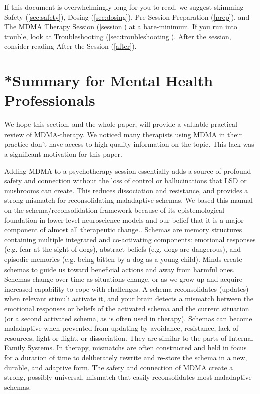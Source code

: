 \documentclass[12pt,letterpaper]{article}
\begin{document}
If this document is overwhelmingly long for you to read, we suggest skimming Safety (\ref{sec:safety}), Dosing (\ref{sec:dosing}), Pre-Session Preparation (\ref{prep}), and The MDMA Therapy Session (\ref{session}) at a bare-minimum. If you run into trouble, look at Troubleshooting (\ref{sec:troubleshooting}). After the session, consider reading After the Session (\ref{after}).
\section{*Summary for Mental Health Professionals}
We hope this section, and the whole paper, will provide a valuable practical review of MDMA-therapy. We noticed many therapists using MDMA in their practice don't have access to high-quality information on the topic. This lack was a significant motivation for this paper.

Adding MDMA to a psychotherapy session essentially adds a source of profound safety and connection without the loss of control or hallucinations that LSD or mushrooms can create. This reduces dissociation and resistance, and provides a strong mismatch for reconsolidating maladaptive schemas. We based this manual on the schema/reconsolidation framework because of its epistemological foundation in lower-level neuroscience models and our belief that it is a major component of almost all therapeutic change.. Schemas are memory structures containing multiple integrated and co-activating components: emotional responses (e.g. fear at the sight of dogs), abstract beliefs (e.g. dogs are dangerous), and episodic memories (e.g. being bitten by a dog as a young child). Minds create schemas to guide us toward beneficial actions and away from harmful ones. Schemas change over time as situations change, or as we grow up and acquire increased capability to cope with challenges. A schema reconsolidates (updates) when relevant stimuli activate it, and your brain detects a mismatch between the emotional responses or beliefs of the activated schema and the current situation (or a second activated schema, as is often used in therapy). Schemas can become maladaptive when prevented from updating by avoidance, resistance, lack of resources, fight-or-flight, or dissociation. They are similar to the parts of Internal Family Systems. In therapy, mismatchs are often constructed and held in focus for a duration of time to deliberately rewrite and re-store the schema in a new, durable, and adaptive form. The safety and connection of MDMA create a strong, possibly universal, mismatch that easily reconsolidates most maladaptive schemas.
\end{document}
